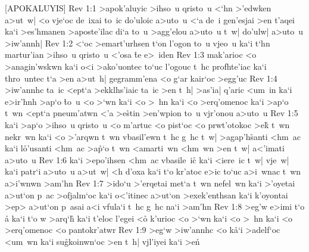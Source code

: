 [APOKALUYIS]
\vs Rev 1:1
>apok'aluyic
>ihso~u
qristo~u
<`hn
>'edwken
a>ut~w|
<o
vje`oc
de~ixai
to~ic
do'uloic
a>uto~u
<`a
de~i
gen'esjai
>en
t'aqei
ka`i
>es'hmanen
>aposte'ilac
di`a
to~u
>agg'elou
a>uto~u
t~w|
do'ulw|
a>uto~u
>iw'annh|\bibvsend
\vs Rev 1:2
<`oc
>emart'urhsen
t`on
l'ogon
to~u
vjeo~u
ka`i
t`hn
martur'ian
>ihso~u
qristo~u
<'osa
\r{t}e
e>~iden\bibvsend
\vs Rev 1:3
mak'arioc
<o
>anagin'wskwn
ka`i
o<i
>ako'uontec
to`uc
l'ogouc
t~hc
profhte'iac
ka`i
thro~untec
t`a
>en
a>ut~h|
gegramm'ena
<o
g`ar
kair`oc
>egg'uc\bibvsend
\vs Rev 1:4
>iw'annhc
ta~ic
<ept`a
>ekklhs'iaic
ta~ic
>en
t~h|
>as'ia|
q'aric
<um~in
ka`i
e>ir'hnh
>ap`o
\r{t}o~u
<o
>`wn
ka`i
<o
>~hn
ka`i
<o
>erq'omenoc
ka`i
>ap`o
t~wn
<ept`a
pneum'atwn
<'a
>e\r{s}tin
>en'wpion
to~u
vjr'onou
a>uto~u\bibvsend
\vs Rev 1:5
ka`i
>ap`o
>ihso~u
qristo~u
<o
m'artuc
<o
pist`oc
<o
prwt'otokoc
>e\r{k}
t~wn
nekr~wn
ka`i
<o
>'arqwn
t~wn
vbasil'ewn
t~hc
g~hc
t~w|
>agap'h\r{s}anti
<hm~ac
ka`i
l\r{o}'usanti
<hm~ac
>a\r{p}`o
t~wn
<amarti~wn
<hm~wn
>en
t~w|
a<'imati
a>uto~u\bibvsend
\vs Rev 1:6
ka`i
>epo'ihsen
<hm~ac
vbasile~ic\r{}
ka`i
<iere~ic
t~w|
vje~w|
ka`i
patr`i
a>uto~u
a>ut~w|
<h
d'oxa
ka`i
t`o
kr'atoc
e>ic
to`uc
a>i~wnac
t~wn
a>i'wnwn
>am'hn\bibvsend
\vs Rev 1:7
>ido`u
>'erqetai
met`a
t~wn
nefel~wn
ka`i
>'oyetai
a>ut`on
p~ac
>ofjalm`oc
ka`i
o<'itinec
a>ut`on
>exek'enthsan
ka`i
k'oyontai
>ep>
a>ut`on
p~asai
a<i
vfula`i
t~hc
g~hc
na`i
>am'hn\bibvsend
\vs Rev 1:8
>eg'w
e>imi
t`o
\r{a}
ka`i
t`o
w
>arq`h\r{}
ka`i
t'eloc
l'egei
<o\r{}
k'urioc
<o
>`wn
ka`i
<o
>~hn
ka`i
<o
>erq'omenoc
<o
pantokr'atwr\bibvsend
\vs Rev 1:9
>eg`w
>iw'annhc
<o
k\r{a}`i
>adelf`oc
<um~wn
ka`i
su\r{g}koinwn`oc
>en
t~h|
vjl'iyei
ka`i
>en\r{}
